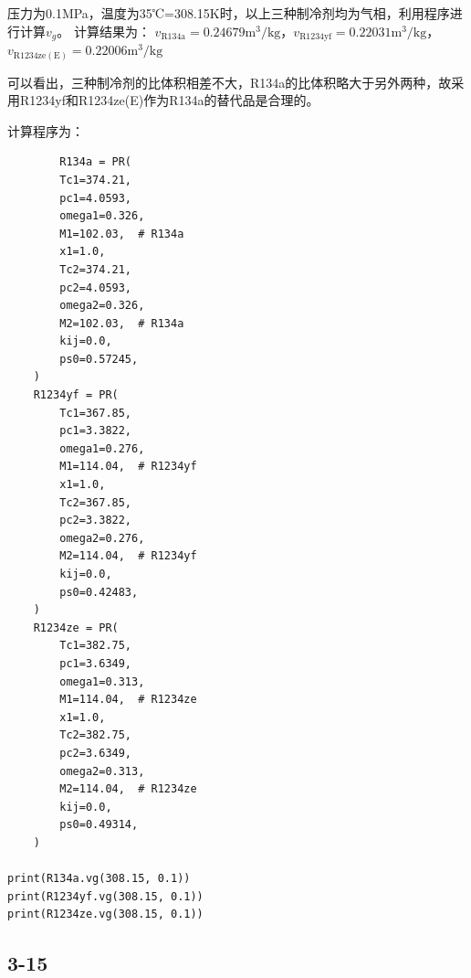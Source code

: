\documentclass[12pt,a4paper]{article}
\begin{document}
压力为0.1MPa，温度为35℃=308.15K时，以上三种制冷剂均为气相，利用程序进行计算$v_g$。
计算结果为：
$v_\mathrm{R134a}=0.24679\mathrm{m^3/kg}$，$v_\mathrm{R1234yf}=0.22031\mathrm{m^3/kg}$，$v_\mathrm{R1234ze(E)}=0.22006\mathrm{m^3/kg}$

可以看出，三种制冷剂的比体积相差不大，R134a的比体积略大于另外两种，故采用R1234yf和R1234ze(E)作为R134a的替代品是合理的。

计算程序为：
\begin{lstlisting}
        R134a = PR(
        Tc1=374.21,
        pc1=4.0593,
        omega1=0.326,
        M1=102.03,  # R134a
        x1=1.0,
        Tc2=374.21,
        pc2=4.0593,
        omega2=0.326,
        M2=102.03,  # R134a
        kij=0.0,
        ps0=0.57245,
    )
    R1234yf = PR(
        Tc1=367.85,
        pc1=3.3822,
        omega1=0.276,
        M1=114.04,  # R1234yf
        x1=1.0,
        Tc2=367.85,
        pc2=3.3822,
        omega2=0.276,
        M2=114.04,  # R1234yf
        kij=0.0,
        ps0=0.42483,
    )
    R1234ze = PR(
        Tc1=382.75,
        pc1=3.6349,
        omega1=0.313,
        M1=114.04,  # R1234ze
        x1=1.0,
        Tc2=382.75,
        pc2=3.6349,
        omega2=0.313,
        M2=114.04,  # R1234ze
        kij=0.0,
        ps0=0.49314,
    )

print(R134a.vg(308.15, 0.1))
print(R1234yf.vg(308.15, 0.1))
print(R1234ze.vg(308.15, 0.1))
\end{lstlisting}

\subsection*{3-15}
\end{document}
